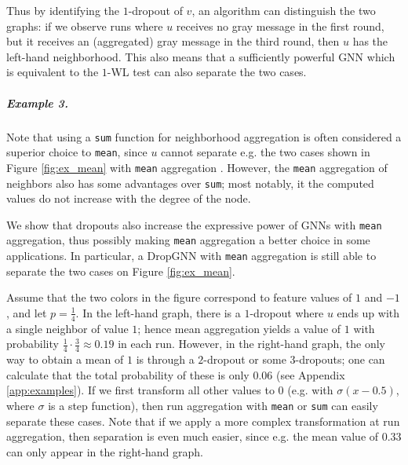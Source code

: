 \documentclass{article}
\begin{document}
Thus by identifying the $1$-dropout of $v$, an algorithm can distinguish the two graphs: if we observe runs where $u$ receives no gray message in the first round, but it receives an (aggregated) gray message in the third round, then $u$ has the left-hand neighborhood. This also means that a sufficiently powerful GNN which is equivalent to the $1$-WL test can also separate the two cases.

\subparagraph*{Example 3.} Note that using a \texttt{sum} function for neighborhood aggregation is often considered a superior choice to \texttt{mean}, since $u$ cannot separate e.g. the two cases shown in Figure \ref{fig:ex_mean} with \texttt{mean} aggregation \citep{GIN}. However, the \texttt{mean} aggregation of neighbors also has some advantages over \texttt{sum}; most notably, it the computed values do not increase with the degree of the node.

We show that dropouts also increase the expressive power of GNNs with \texttt{mean} aggregation, thus possibly making \texttt{mean} aggregation a better choice in some applications. In particular, a DropGNN with \texttt{mean} aggregation is still able to separate the two cases on Figure \ref{fig:ex_mean}.

Assume that the two colors in the figure correspond to feature values of $1$ and $-1$, and let $p=\frac{1}{4}$. In the left-hand graph, there is a $1$-dropout where $u$ ends up with a single neighbor of value $1$; hence mean aggregation yields a value of $1$ with probability $\frac{1}{4} \cdot \frac{3}{4} \approx 0.19$ in each run. However, in the right-hand graph, the only way to obtain a mean of $1$ is through a $2$-dropout or some $3$-dropouts; one can calculate that the total probability of these is only $0.06$ (see Appendix \ref{app:examples}). If we first transform all other values to $0$ (e.g. with $\sigma(x-0.5)$, where $\sigma$ is a step function), then run aggregation with \texttt{mean} or \texttt{sum} can easily separate these cases. Note that if we apply a more complex transformation at run aggregation, then separation is even much easier, since e.g. the mean value of 0.33 can only appear in the right-hand graph.
\end{document}
